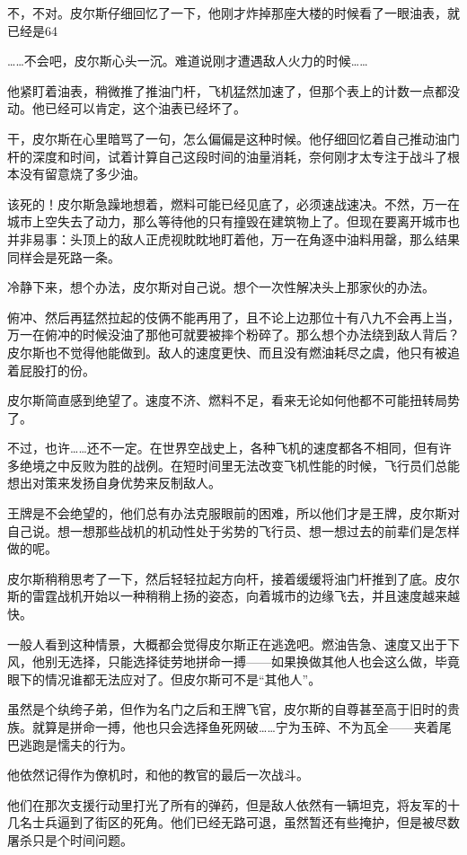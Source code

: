 不，不对。皮尔斯仔细回忆了一下，他刚才炸掉那座大楼的时候看了一眼油表，就已经是64%

……不会吧，皮尔斯心头一沉。难道说刚才遭遇敌人火力的时候……

他紧盯着油表，稍微推了推油门杆，飞机猛然加速了，但那个表上的计数一点都没动。他已经可以肯定，这个油表已经坏了。

干，皮尔斯在心里暗骂了一句，怎么偏偏是这种时候。他仔细回忆着自己推动油门杆的深度和时间，试着计算自己这段时间的油量消耗，奈何刚才太专注于战斗了根本没有留意烧了多少油。

该死的！皮尔斯急躁地想着，燃料可能已经见底了，必须速战速决。不然，万一在城市上空失去了动力，那么等待他的只有撞毁在建筑物上了。但现在要离开城市也并非易事：头顶上的敌人正虎视眈眈地盯着他，万一在角逐中油料用罄，那么结果同样会是死路一条。

冷静下来，想个办法，皮尔斯对自己说。想个一次性解决头上那家伙的办法。

俯冲、然后再猛然拉起的伎俩不能再用了，且不论上边那位十有八九不会再上当，万一在俯冲的时候没油了那他可就要被摔个粉碎了。那么想个办法绕到敌人背后？皮尔斯也不觉得他能做到。敌人的速度更快、而且没有燃油耗尽之虞，他只有被追着屁股打的份。

皮尔斯简直感到绝望了。速度不济、燃料不足，看来无论如何他都不可能扭转局势了。

不过，也许……还不一定。在世界空战史上，各种飞机的速度都各不相同，但有许多绝境之中反败为胜的战例。在短时间里无法改变飞机性能的时候，飞行员们总能想出对策来发扬自身优势来反制敌人。

王牌是不会绝望的，他们总有办法克服眼前的困难，所以他们才是王牌，皮尔斯对自己说。想一想那些战机的机动性处于劣势的飞行员、想一想过去的前辈们是怎样做的呢。

皮尔斯稍稍思考了一下，然后轻轻拉起方向杆，接着缓缓将油门杆推到了底。皮尔斯的雷霆战机开始以一种稍稍上扬的姿态，向着城市的边缘飞去，并且速度越来越快。

一般人看到这种情景，大概都会觉得皮尔斯正在逃逸吧。燃油告急、速度又出于下风，他别无选择，只能选择徒劳地拼命一搏——如果换做其他人也会这么做，毕竟眼下的情况谁都无法应对了。但皮尔斯可不是“其他人”。

虽然是个纨绔子弟，但作为名门之后和王牌飞官，皮尔斯的自尊甚至高于旧时的贵族。就算是拼命一搏，他也只会选择鱼死网破……宁为玉碎、不为瓦全——夹着尾巴逃跑是懦夫的行为。

他依然记得作为僚机时，和他的教官的最后一次战斗。

他们在那次支援行动里打光了所有的弹药，但是敌人依然有一辆坦克，将友军的十几名士兵逼到了街区的死角。他们已经无路可退，虽然暂还有些掩护，但是被尽数屠杀只是个时间问题。

